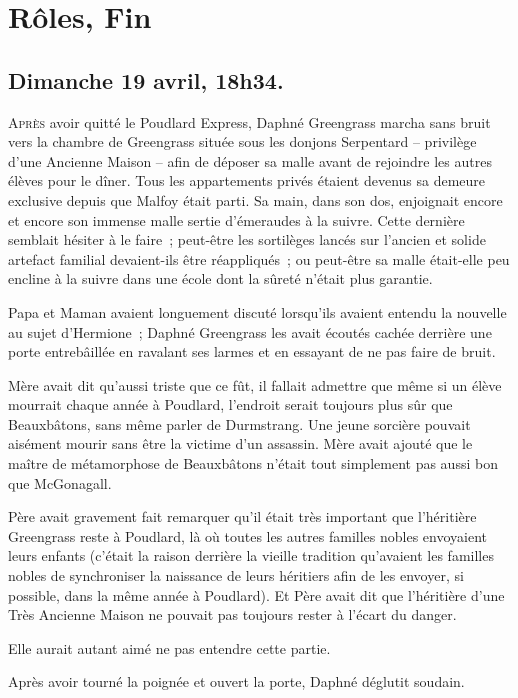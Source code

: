 \chapter{Rôles, Fin}

\section{Dimanche 19 avril, 18h34.}

\lettrine{A}{près} avoir quitté le Poudlard Express, Daphné Greengrass marcha sans bruit vers la chambre de Greengrass située sous les donjons Serpentard -- privilège d'une Ancienne Maison -- afin de déposer sa malle avant de rejoindre les autres élèves pour le dîner. Tous les appartements privés étaient devenus sa demeure exclusive depuis que Malfoy était parti. Sa main, dans son dos, enjoignait encore et encore son immense malle sertie d'émeraudes à la suivre. Cette dernière semblait hésiter à le faire~; peut-être les sortilèges lancés sur l'ancien et solide artefact familial devaient-ils être réappliqués~; ou peut-être sa malle était-elle peu encline à la suivre dans une école dont la sûreté n'était plus garantie.

Papa et Maman avaient longuement discuté lorsqu'ils avaient entendu la nouvelle au sujet d'Hermione~; Daphné Greengrass les avait écoutés cachée derrière une porte entrebâillée en ravalant ses larmes et en essayant de ne pas faire de bruit.

Mère avait dit qu'aussi triste que ce fût, il fallait admettre que même si un élève mourrait chaque année à Poudlard, l'endroit serait toujours plus sûr que Beauxbâtons, sans même parler de Durmstrang. Une jeune sorcière pouvait aisément mourir sans être la victime d'un assassin. Mère avait ajouté que le maître de métamorphose de Beauxbâtons n'était tout simplement pas aussi bon que McGonagall.

Père avait gravement fait remarquer qu'il était très important que l'héritière Greengrass reste à Poudlard, là où toutes les autres familles nobles envoyaient leurs enfants (c'était la raison derrière la vieille tradition qu'avaient les familles nobles de synchroniser la naissance de leurs héritiers afin de les envoyer, si possible, dans la même année à Poudlard). Et Père avait dit que l'héritière d'une Très Ancienne Maison ne pouvait pas toujours rester à l'écart du danger.

Elle aurait autant aimé ne pas entendre cette partie.

Après avoir tourné la poignée et ouvert la porte, Daphné déglutit soudain.

